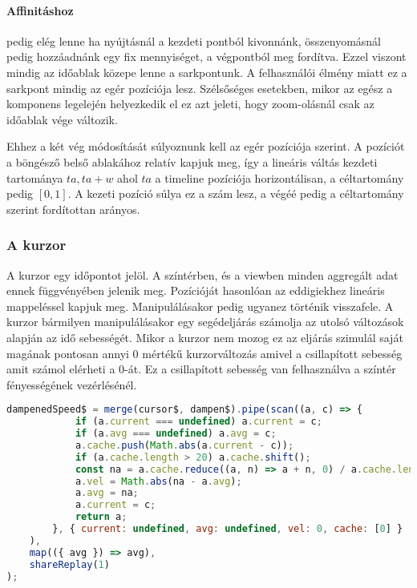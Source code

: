 \paragraph{Affinitáshoz} pedig elég lenne ha nyújtásnál a kezdeti pontból kivonnánk, összenyomásnál pedig hozzáadnánk egy fix mennyiséget, a végpontból meg fordítva. Ezzel viszont mindig az időablak közepe lenne a sarkpontunk. A felhasználói élmény miatt ez a sarkpont mindig az egér pozíciója lesz. Szélsőséges esetekben, mikor az egész a komponens legelején helyezkedik el ez azt jeleti, hogy zoom-olásnál csak az időablak vége változik.

Ehhez a két vég módosítását súlyoznunk kell az egér pozíciója szerint. A pozíciót a böngésző belső ablakához relatív kapjuk meg, így a lineáris váltás kezdeti tartománya ${ta, ta + w}$ ahol $ta$ a timeline pozíciója horizontálisan, a céltartomány pedig $[0, 1]$. A kezeti pozíció súlya ez a szám lesz, a végéé pedig a céltartomány szerint fordítottan arányos.

\subsubsection{A kurzor}

A kurzor egy időpontot jelöl. A színtérben, és a viewben minden aggregált adat ennek függvényében jelenik meg. Pozícióját hasonlóan az eddigiekhez lineáris mappeléssel kapjuk meg. Manipulálásakor pedig ugyanez történik visszafele. A kurzor bármilyen manipulálásakor egy segédeljárás számolja az utolsó változások alapján az idő sebességét. Mikor a kurzor nem mozog ez az eljárás szimulál saját magának pontosan annyi $0$ mértékű kurzorváltozás amivel a csillapított sebesség amit számol elérheti a $0$-át. Ez a csillapított sebesség van felhasználva a színtér fényességének vezérlésénél.

\begin{lstlisting}[language={JavaScript}]
dampenedSpeed$ = merge(cursor$, dampen$).pipe(scan((a, c) => {
			if (a.current === undefined) a.current = c;
			if (a.avg === undefined) a.avg = c;
			a.cache.push(Math.abs(a.current - c));
			if (a.cache.length > 20) a.cache.shift();
			const na = a.cache.reduce((a, n) => a + n, 0) / a.cache.length;
			a.vel = Math.abs(na - a.avg);
			a.avg = na;
			a.current = c;
			return a;
		}, { current: undefined, avg: undefined, vel: 0, cache: [0] }
	),
	map(({ avg }) => avg),
	shareReplay(1)
);
\end{lstlisting}


